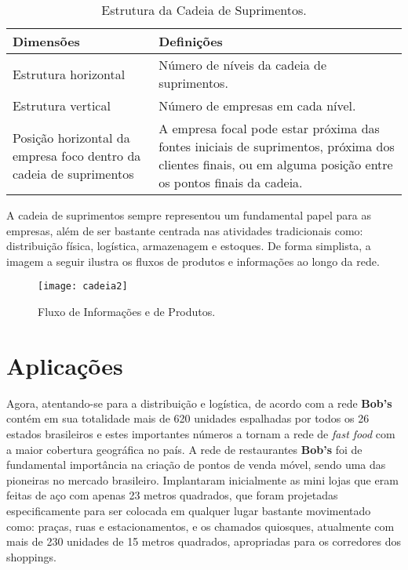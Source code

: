 		\label{subsubsec:cadeia_table}
		\begin{table}[h]
			\centering
			\begin{tabular}{|p{6cm}|p{8cm}|}
				\hline
				\textbf{Dimensões} & \textbf{Definições}  \\ \hline
				Estrutura horizontal & Número de níveis da cadeia de suprimentos. \\ \hline
				Estrutura vertical & Número de empresas em cada nível. \\ \hline
				Posição horizontal da empresa foco dentro da cadeia de suprimentos & A empresa focal pode estar próxima das fontes iniciais de suprimentos, próxima dos clientes finais, ou em alguma posição entre os pontos finais da cadeia. \\ \hline
			\end{tabular}
			\caption[Estrutura da Cadeia de Suprimentos]{Estrutura da Cadeia de Suprimentos. \cite{chopra}}
			\label{tab:cadeia_.table}
		\end{table}

		A cadeia de suprimentos sempre representou um fundamental papel para as empresas, além de ser bastante centrada nas atividades tradicionais como: distribuição física, logística, armazenagem e estoques. De forma simplista, a imagem a seguir ilustra os fluxos de produtos e informações ao longo da rede.

		\begin{figure}[h]
			\centering
			\texttt{[image: cadeia2]}
			\caption[Fluxo de informações e de produtos]{Fluxo de Informações e de Produtos.}
			\label{fig:cadeia2}
		\end{figure}

	\section[Aplicações]{Aplicações}
	\label{sec:cadeia_aplicacoes}

		Agora, atentando-se para a distribuição e logística, de acordo com \cite{junior} a rede \textbf{Bob’s} contém em sua totalidade mais de 620 unidades espalhadas por todos os 26 estados brasileiros e estes importantes números a tornam a rede de \emph{fast food} com a maior cobertura geográfica no país. A rede de restaurantes \textbf{Bob’s} foi de fundamental importância na criação de pontos de venda móvel, sendo uma das pioneiras no mercado brasileiro. Implantaram inicialmente as mini lojas que eram feitas de aço com apenas 23 metros quadrados, que foram projetadas especificamente para ser colocada em qualquer lugar bastante movimentado como: praças, ruas e estacionamentos, e os chamados quiosques, atualmente com mais de 230 unidades de 15 metros quadrados, apropriadas para os corredores dos shoppings.


